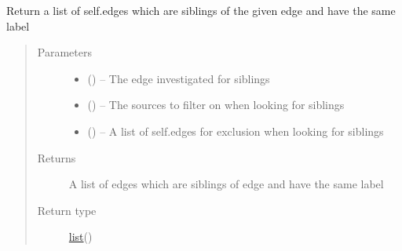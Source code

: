 \documentclass[letterpaper,10pt,english]{sphinxmanual}
\begin{document}
\begin{fulllineitems}
\begin{fulllineitems}
\begin{quote}
\begin{description}
\end{description}\end{quote}

\end{fulllineitems}


\begin{fulllineitems}
\label{\detokenize{concept_map:concept_map.ConceptMap.find_siblings}}
Return a list of self.edges which are siblings of the given edge and have the same label
\begin{quote}\begin{description}
\item[{Parameters}] \leavevmode\begin{itemize}
\item {} 
 ({\hyperref[\detokenize{edge:edge.Edge}]{}}) -- The edge investigated for siblings

\item {} 
 (\href{https://docs.python.org/2/library/functions.html\#list}{}\sphinxstyleliteralemphasis{(}\href{https://docs.python.org/2/library/string.html\#module-string}{}\sphinxstyleliteralemphasis{)}\sphinxstyleliteralemphasis{}) -- The sources to filter on when looking for siblings

\item {} 
 (\href{https://docs.python.org/2/library/functions.html\#list}{}\sphinxstyleliteralemphasis{)}\sphinxstyleliteralemphasis{}) -- A list of self.edges for exclusion when looking for siblings

\end{itemize}

\item[{Returns}] \leavevmode
A list of edges which are siblings of edge and have the same label

\item[{Return type}] \leavevmode
\href{https://docs.python.org/2/library/functions.html\#list}{list}({\hyperref[\detokenize{edge:module-edge}]{}})


\end{description}
\end{quote}
\end{fulllineitems}
\end{fulllineitems}
\end{document}
